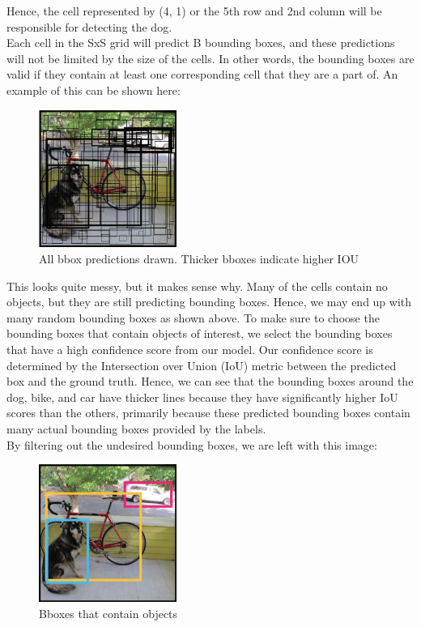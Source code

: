 \documentclass{article}
\begin{document}
Hence, the cell represented by (4, 1) or the 5th row and 2nd column will be responsible for detecting the dog. \\

Each cell in the SxS grid will predict B bounding boxes, and these predictions will not be limited by the size of the cells. In other words, the bounding boxes are valid if they contain at least one corresponding cell that they are a part of. An example of this can be shown here:

\begin{figure}[H]
  \centering
  \includegraphics[width=0.4\textwidth]{Images/Grid_bbox.png}
  \caption{All bbox predictions drawn. Thicker bboxes indicate higher IOU}
  \label{fig:example}
\end{figure}

This looks quite messy, but it makes sense why. Many of the cells contain no objects, but they are still predicting bounding boxes. Hence, we may end up with many random bounding boxes as shown above. To make sure to choose the bounding boxes that contain objects of interest, we select the bounding boxes that have a high confidence score from our model. Our confidence score is determined by the Intersection over Union (IoU) metric between the predicted box and the ground truth. Hence, we can see that the bounding boxes around the dog, bike, and car have thicker lines because they have significantly higher IoU scores than the others, primarily because these predicted bounding boxes contain many actual bounding boxes provided by the labels. \\

By filtering out the undesired bounding boxes, we are left with this image:

\begin{figure}[H]
  \centering
  \includegraphics[width=0.4\textwidth]{Images/Grid_detections.png}
  \caption{Bboxes that contain objects}
  \label{fig:example}
\end{figure}
\end{document}
